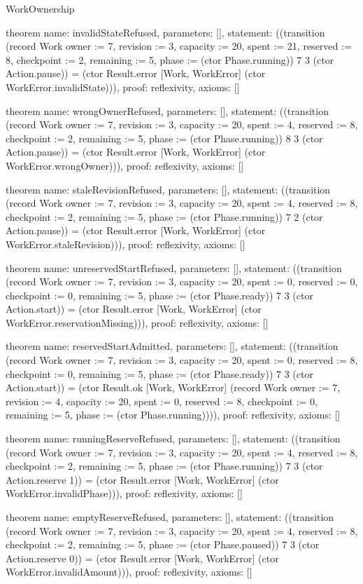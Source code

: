 \begin{lexlean}{WorkOwnership}
\begin{semanticmodule}
theorem{
  name: invalidStateRefused,
  parameters: [],
  statement: ((transition (record Work {owner := 7, revision := 3, capacity := 20, spent := 21, reserved := 8, checkpoint := 2, remaining := 5, phase := (ctor Phase.running)}) 7 3 (ctor Action.pause)) = (ctor Result.error [Work, WorkError] (ctor WorkError.invalidState))),
  proof: reflexivity{},
  axioms: []
}

theorem{
  name: wrongOwnerRefused,
  parameters: [],
  statement: ((transition (record Work {owner := 7, revision := 3, capacity := 20, spent := 4, reserved := 8, checkpoint := 2, remaining := 5, phase := (ctor Phase.running)}) 8 3 (ctor Action.pause)) = (ctor Result.error [Work, WorkError] (ctor WorkError.wrongOwner))),
  proof: reflexivity{},
  axioms: []
}

theorem{
  name: staleRevisionRefused,
  parameters: [],
  statement: ((transition (record Work {owner := 7, revision := 3, capacity := 20, spent := 4, reserved := 8, checkpoint := 2, remaining := 5, phase := (ctor Phase.running)}) 7 2 (ctor Action.pause)) = (ctor Result.error [Work, WorkError] (ctor WorkError.staleRevision))),
  proof: reflexivity{},
  axioms: []
}

theorem{
  name: unreservedStartRefused,
  parameters: [],
  statement: ((transition (record Work {owner := 7, revision := 3, capacity := 20, spent := 0, reserved := 0, checkpoint := 0, remaining := 5, phase := (ctor Phase.ready)}) 7 3 (ctor Action.start)) = (ctor Result.error [Work, WorkError] (ctor WorkError.reservationMissing))),
  proof: reflexivity{},
  axioms: []
}

theorem{
  name: reservedStartAdmitted,
  parameters: [],
  statement: ((transition (record Work {owner := 7, revision := 3, capacity := 20, spent := 0, reserved := 8, checkpoint := 0, remaining := 5, phase := (ctor Phase.ready)}) 7 3 (ctor Action.start)) = (ctor Result.ok [Work, WorkError] (record Work {owner := 7, revision := 4, capacity := 20, spent := 0, reserved := 8, checkpoint := 0, remaining := 5, phase := (ctor Phase.running)}))),
  proof: reflexivity{},
  axioms: []
}

theorem{
  name: runningReserveRefused,
  parameters: [],
  statement: ((transition (record Work {owner := 7, revision := 3, capacity := 20, spent := 4, reserved := 8, checkpoint := 2, remaining := 5, phase := (ctor Phase.running)}) 7 3 (ctor Action.reserve 1)) = (ctor Result.error [Work, WorkError] (ctor WorkError.invalidPhase))),
  proof: reflexivity{},
  axioms: []
}

theorem{
  name: emptyReserveRefused,
  parameters: [],
  statement: ((transition (record Work {owner := 7, revision := 3, capacity := 20, spent := 4, reserved := 8, checkpoint := 2, remaining := 5, phase := (ctor Phase.paused)}) 7 3 (ctor Action.reserve 0)) = (ctor Result.error [Work, WorkError] (ctor WorkError.invalidAmount))),
  proof: reflexivity{},
  axioms: []
}


\end{semanticmodule}
\end{lexlean}
